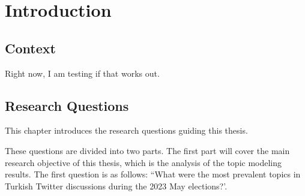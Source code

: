 
\chapter{Introduction}\label{chapter:introduction}

\section{Context}

Right now, I am testing if that works out.

\section{Research Questions}

This chapter introduces the research questions guiding this thesis. 


These questions are divided into two parts.
The first part will cover the main research objective of this thesis, 
which is the analysis of the topic modeling results. The first question is as follows:
``What were the most prevalent topics in Turkish Twitter discussions during the 2023 May elections?'.

